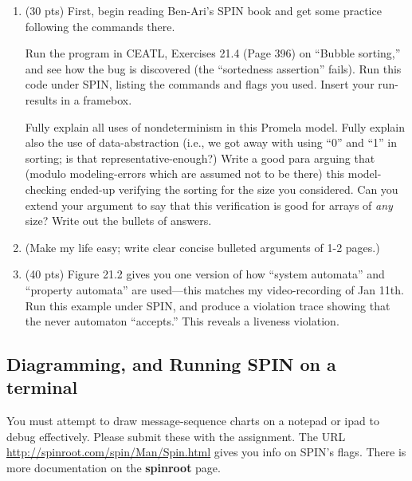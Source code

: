 \documentclass[11pt]{article}
\begin{document}
\begin{enumerate}
\item (30 pts) First, begin reading Ben-Ari's SPIN book and get some practice
  following the commands there.

  Run the program in CEATL, Exercises
  21.4 (Page 396) on ``Bubble sorting,'' and see how the bug is discovered
  (the ``sortedness assertion'' fails).
  Run this code under SPIN, listing the commands and flags you used.
  Insert your run-results in a framebox.
  
  Fully explain all uses of nondeterminism in this Promela model.
  Fully explain also the use of data-abstraction (i.e., we got away with
  using ``0'' and ``1'' in sorting; is that representative-enough?)
  Write a good para arguing that (modulo modeling-errors which are assumed
  not to be there) this model-checking ended-up verifying the sorting for the size
  you considered.
  Can you extend your argument to say that this verification is good for
  arrays of {\em any} size? Write out the bullets of answers.
  
  \item[] (Make my life easy; write clear concise bulleted arguments of 1-2 pages.)

    \clearpage
  
  \item (40 pts) Figure 21.2 gives you one version of how ``system automata''
    and ``property automata'' are used---this matches my video-recording
    of Jan 11th.
    Run this example under SPIN, and produce a violation trace showing that
    the never automaton ``accepts.'' This reveals a liveness violation.
\end{enumerate}

    \clearpage
    
\subsection*{Diagramming, and Running SPIN on a terminal}

You must attempt to draw message-sequence charts on a notepad or ipad to debug effectively.
Please submit these with the assignment.
The URL \url{http://spinroot.com/spin/Man/Spin.html} gives you info on SPIN's flags.
There is more documentation on the {\bf spinroot} page.
\end{document}

